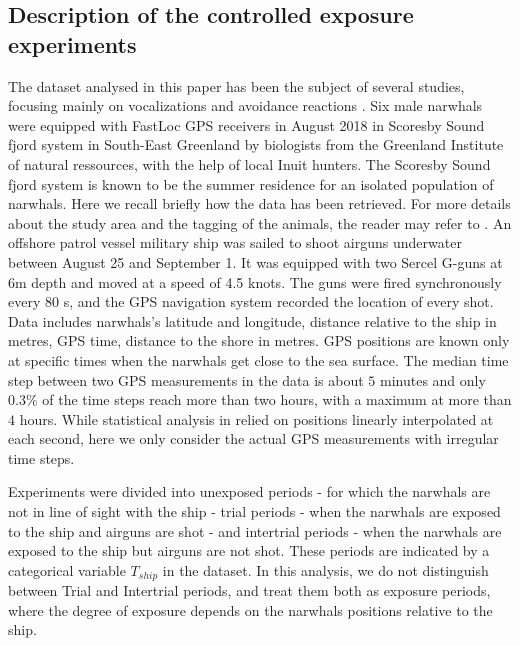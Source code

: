 \documentclass[11pt]{article}
\newcommand {\1}{\mathbb{1}}
\theoremstyle{definition}
\theoremstyle{remark}
\theoremstyle{remark}
\begin{document}
\subsection{Description of the controlled exposure experiments}

The dataset analysed in this paper has been the subject of several studies, focusing mainly on vocalizations and avoidance reactions \cite{heide-jorgensen_behavioral_2021,tervo_narwhals_2021}. 
Six male narwhals were equipped with FastLoc GPS receivers in August 2018 in Scoresby Sound fjord system in South-East Greenland by biologists from the Greenland Institute of natural ressources, with the help of local Inuit hunters. The Scoresby Sound fjord system
is known to be the summer residence for an isolated population of narwhals.
Here we recall briefly how the data has been retrieved. For more details about the study area and the tagging of the animals, the reader may refer to \cite{heide-jorgensen_behavioral_2021}. 
An offshore patrol vessel military ship was sailed to shoot airguns underwater between August 25 and September 1. It was equipped with two Sercel G-guns at 6m depth and moved at a speed of 4.5 knots. The guns were fired synchronously every 80 s, and the GPS navigation system recorded the location of every shot. 
Data includes narwhals's latitude and longitude, distance relative to the ship in metres, GPS time, distance to the shore in metres. GPS positions are known only at specific times when the narwhals get close to the sea surface. The median time step between two GPS measurements in the data is about $5$ minutes and only $0.3 \%$ of the time steps reach more than two hours, with a maximum at more than $4$ hours. While statistical analysis in \cite{heide-jorgensen_behavioral_2021} relied on positions linearly interpolated at each second, here we only consider the actual GPS measurements with irregular time steps.



Experiments were divided into unexposed periods - for which the narwhals are not in line of sight with the ship - trial periods - when the narwhals are exposed to the ship and airguns are shot - and intertrial periods - when the narwhals are exposed to the ship but airguns are not shot. These periods are indicated by a categorical variable $T_{ship}$ in the dataset. In this analysis, we do not distinguish between Trial and Intertrial periods, and treat them both as exposure periods, where the degree of exposure depends on the narwhals positions relative to the ship.
\end{document}
